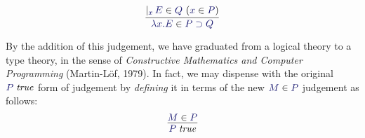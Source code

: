 \documentclass[main.tex]{subfiles}
\begin{document}
%
\[
  \infer{
    \ver{\lambda x.E}{P\supset Q}
  }{
    \genj{x}{\hyp{\ver{E}{Q}}{\ver{x}{P}}}
  }
\]

By the addition of this judgement, we have graduated from a logical theory to a
type theory, in the sense of \emph{Constructive Mathematics and Computer
Programming} (Martin-L\"of, 1979). In fact, we may dispense with the original
$\istrue{P}$ form of judgement by \emph{defining} it in terms of the new
$\ver{M}{P}$ judgement as follows:
\[
  \infer{
    \istrue{P}
  }{
    \ver{M}{P}
  }
\]

\end{document}
